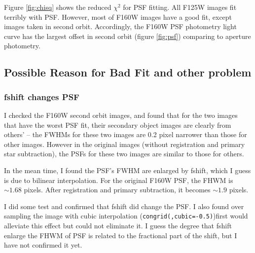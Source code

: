\documentclass[paper=letter, fontsize=11pt]{scrartcl} %
\numberwithin{equation}{section} %
\numberwithin{figure}{section} %
\numberwithin{table}{section} %
\begin{document}
 Figure \ref{fig:chisq} shows the reduced $\chi^{2}$ for PSF
 fitting. All F125W images fit terribly with PSF. However, most of
 F160W images have a good fit, except images taken in second
 orbit. Accordingly, the F160W PSF photometry light curve has the
 largest offset in second orbit (figure \ref{fig:psf}) comparing to
 aperture photometry.\par

\subsection{Possible Reason for Bad Fit and other problem}


\subsubsection{fshift changes PSF}

I checked the F160W second orbit images, and found that for the two
images that have the worst PSF fit, their secondary object images are
clearly from others' -- the FWHMs for these two images are 0.2 pixel
narrower than those for other images. However in the original images
(without registration and primary star subtraction), the PSFs for these
two images are similar to those for others.

In the mean time, I found the PSF's FWHM are enlarged by fshift, which
I guess is due to bilinear interpolation. For the original F160W
PSF, the FHWM is $\sim 1.68$ pixels. After registration and primary
subtraction, it becomes $\sim 1.9$ pixels.

I did some test and confirmed that fshift did change the PSF. I also
found over sampling the image with cubic interpolation
(\texttt{congrid(,cubic=-0.5)})first would alleviate this effect but
could not eliminate it. I guess the degree that fshift enlarge the
FHWM of PSF is related to the fractional part of the shift, but I have
not confirmed it yet.
\end{document}
